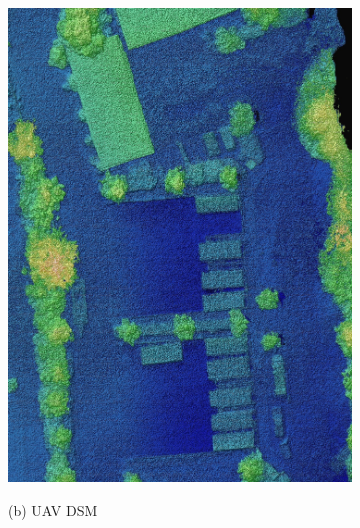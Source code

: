 \begin{figure}[tbp]
\begin{subfigure}[b]{0.3\columnwidth}
           \includegraphics[width=\textwidth]{figures_5/germering_dsm_uav_meitu.jpg}         
           {{\small }}    
           \centerline{\small{(b) UAV DSM}}\medskip
       \end{subfigure}
       \hfill
       \begin{subfigure}[b]{0.35\columnwidth}
           \centering

\end{subfigure}
\end{figure}
